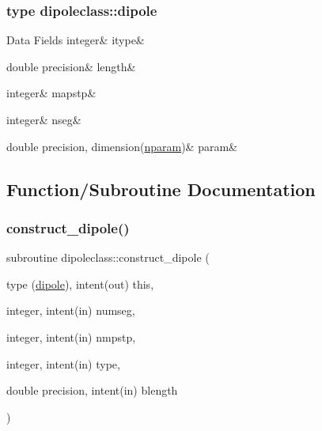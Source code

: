 \subsubsection{type dipoleclass\+::dipole}
\begin{DoxyFields}{Data Fields}
\mbox{\label{namespacedipoleclass_a488890695ad6becc93db5079e740868e}} 
integer&
itype&
\\
\hline

\mbox{\label{namespacedipoleclass_aada668e2b218b56769c64c2ec9f21dea}} 
double precision&
length&
\\
\hline

\mbox{\label{namespacedipoleclass_af0a1da636573d6878f6d1c11d0c9e5ab}} 
integer&
mapstp&
\\
\hline

\mbox{\label{namespacedipoleclass_a5f280e96dab020ba48b5b28f47b0d5fa}} 
integer&
nseg&
\\
\hline

\mbox{\label{namespacedipoleclass_a5ce0b668334f66ce50e3852ce17ddc39}} 
double precision, dimension(\mbox{\hyperlink{namespacedipoleclass_abc619199e1e9a2811da9e97630125da3}{nparam}})&
param&
\\
\hline

\end{DoxyFields}


\subsection{Function/\+Subroutine Documentation}
\mbox{\label{namespacedipoleclass_ad926e6953a9110fb9662f9d75aec0578}} 
\subsubsection{\texorpdfstring{construct\_dipole()}{construct\_dipole()}}
{\footnotesize\ttfamily subroutine dipoleclass\+::construct\+\_\+dipole (\begin{DoxyParamCaption}\item[{type (\mbox{\hyperlink{namespacedipoleclass_structdipoleclass_1_1dipole}{dipole}}), intent(out)}]{this,  }\item[{integer, intent(in)}]{numseg,  }\item[{integer, intent(in)}]{nmpstp,  }\item[{integer, intent(in)}]{type,  }\item[{double precision, intent(in)}]{blength }\end{DoxyParamCaption})}

